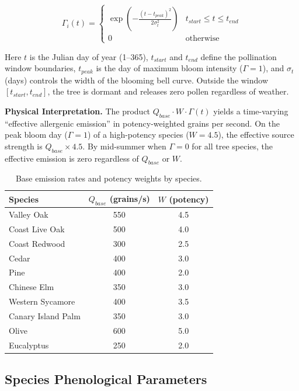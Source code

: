 \documentclass[11pt]{article}
\begin{document}
\begin{equation}
\Gamma_i(t) = \begin{cases} \exp\!\left(-\frac{(t-t_{peak})^2}{2\sigma_t^2}\right) & t_{start} \leq t \leq t_{end} \\ 0 & \text{otherwise} \end{cases}
\label{eq:gate}
\end{equation}

Here $t$ is the Julian day of year (1--365), $t_{start}$ and $t_{end}$ define the pollination window boundaries, $t_{peak}$ is the day of maximum bloom intensity ($\Gamma = 1$), and $\sigma_t$ (days) controls the width of the blooming bell curve. Outside the window $[t_{start}, t_{end}]$, the tree is dormant and releases zero pollen regardless of weather.

\medskip
\noindent\textbf{Physical Interpretation.} The product $Q_{base} \cdot W \cdot \Gamma(t)$ yields a time-varying ``effective allergenic emission'' in potency-weighted grains per second. On the peak bloom day ($\Gamma = 1$) of a high-potency species ($W = 4.5$), the effective source strength is $Q_{base} \times 4.5$. By mid-summer when $\Gamma = 0$ for all tree species, the effective emission is zero regardless of $Q_{base}$ or $W$.

\begin{table}[h]
\centering
\caption{Base emission rates and potency weights by species.}
\label{tab:emission}
\begin{tabular}{@{}lcc@{}}
\toprule
Species & $Q_{base}$ (grains/s) & $W$ (potency) \\
\midrule
Valley Oak & 550 & 4.5 \\
Coast Live Oak & 500 & 4.0 \\
Coast Redwood & 300 & 2.5 \\
Cedar & 400 & 3.0 \\
Pine & 400 & 2.0 \\
Chinese Elm & 350 & 3.0 \\
Western Sycamore & 400 & 3.5 \\
Canary Island Palm & 350 & 3.0 \\
Olive & 600 & 5.0 \\
Eucalyptus & 250 & 2.0 \\
\bottomrule
\end{tabular}
\end{table}

\subsection{Species Phenological Parameters}
\end{document}
